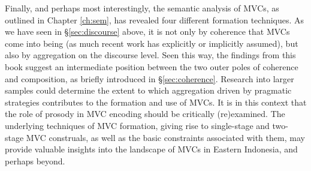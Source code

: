 \largerpage
Finally, and perhaps most interestingly, the semantic analysis of MVCs, as outlined in Chapter \ref{ch:sem}, has revealed four different formation techniques. As we have seen in §\ref{sec:discourse} above, it is not only by coherence that MVCs come into being (as much recent work has explicitly or implicitly assumed), but also by aggregation on the discourse level. Seen this way, the findings from this book suggest an intermediate position between the two outer poles of coherence and composition, as briefly introduced in §\ref{sec:coherence}. Research into larger samples could determine the extent to which aggregation driven by pragmatic strategies contributes to the formation and use of MVCs. It is in this context that the role of prosody in MVC encoding should be critically (re)examined. The underlying techniques of MVC formation, giving rise to single-stage and two-stage MVC construals, as well as the basic constraints associated with them, may provide valuable insights into the landscape of MVCs in Eastern Indonesia, and perhaps beyond.

